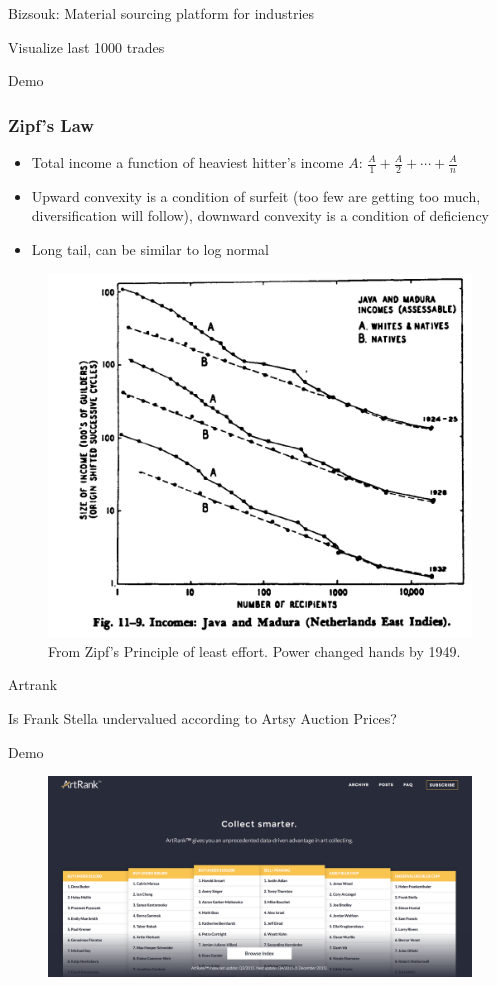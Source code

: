\documentclass{beamer}
\begin{document}

\begin{frame}
	\centerline{Bizsouk: Material sourcing platform for industries}
	\centerline{Visualize last 1000 trades}
	\Huge{\centerline{Demo}}
\end{frame}


\begin{frame}
	\frametitle{Zipf's Law}
	\begin{itemize}
		\item Total income a function of heaviest hitter's income $A$: $\frac{A}{1} + \frac{A}{2} + \cdots + \frac{A}{n}$
		\item Upward convexity is a condition of surfeit (too few are getting too much, diversification will follow), downward convexity is a condition of deficiency
		\item Long tail, can be similar to log normal
	\end{itemize}
	\begin{figure}
		\centering
		\includegraphics[width=0.4\linewidth]{zipf}
		\caption{From Zipf's Principle of least effort. Power changed hands by 1949.}
	\end{figure}
\end{frame}


\begin{frame}
	\centerline{Artrank}
	\centerline{Is Frank Stella undervalued according to Artsy Auction Prices?}
	\Huge{\centerline{Demo}}
	\begin{figure}
		\centering
		\includegraphics[width=0.8\linewidth]{artrank}
	\end{figure}
\end{frame}
\end{document}
